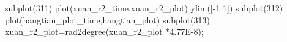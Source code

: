 subplot(311)
plot(xuan_r2_time,xuan_r2_plot)
ylim([-1 1])
subplot(312)
plot(hangtian_plot_time,hangtian_plot)
subplot(313)
xuan_r2_plot=rad2degree(xuan_r2_plot *4.77E-8);